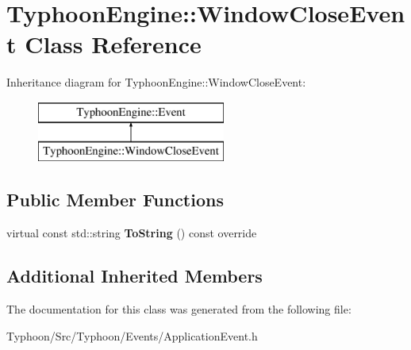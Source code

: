 \hypertarget{class_typhoon_engine_1_1_window_close_event}{}\section{Typhoon\+Engine\+::Window\+Close\+Event Class Reference}
\label{class_typhoon_engine_1_1_window_close_event}
Inheritance diagram for Typhoon\+Engine\+::Window\+Close\+Event\+:\begin{figure}[H]
\begin{center}
\leavevmode
\includegraphics[height=2.000000cm]{class_typhoon_engine_1_1_window_close_event}
\end{center}
\end{figure}
\subsection*{Public Member Functions}
\begin{DoxyCompactItemize}
\item 
\mbox{\label{class_typhoon_engine_1_1_window_close_event_a8cc588fe249bb1dc07b6a6b15f7313af}} 
virtual const std\+::string {\bfseries To\+String} () const override
\end{DoxyCompactItemize}
\subsection*{Additional Inherited Members}


The documentation for this class was generated from the following file\+:\begin{DoxyCompactItemize}
\item 
Typhoon/\+Src/\+Typhoon/\+Events/Application\+Event.\+h\end{DoxyCompactItemize}
